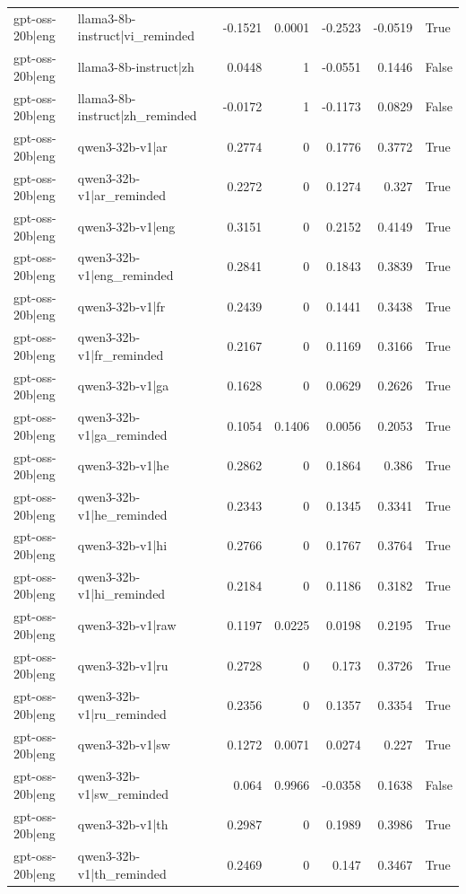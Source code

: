 \begin{table}
\begin{tabular}{l l r r r r l}
gpt-oss-20b|eng & llama3-8b-instruct|vi_reminded & -0.1521 & 0.0001 & -0.2523 & -0.0519 & True \\
gpt-oss-20b|eng & llama3-8b-instruct|zh & 0.0448 & 1 & -0.0551 & 0.1446 & False \\
gpt-oss-20b|eng & llama3-8b-instruct|zh_reminded & -0.0172 & 1 & -0.1173 & 0.0829 & False \\
gpt-oss-20b|eng & qwen3-32b-v1|ar & 0.2774 & 0 & 0.1776 & 0.3772 & True \\
gpt-oss-20b|eng & qwen3-32b-v1|ar_reminded & 0.2272 & 0 & 0.1274 & 0.327 & True \\
gpt-oss-20b|eng & qwen3-32b-v1|eng & 0.3151 & 0 & 0.2152 & 0.4149 & True \\
gpt-oss-20b|eng & qwen3-32b-v1|eng_reminded & 0.2841 & 0 & 0.1843 & 0.3839 & True \\
gpt-oss-20b|eng & qwen3-32b-v1|fr & 0.2439 & 0 & 0.1441 & 0.3438 & True \\
gpt-oss-20b|eng & qwen3-32b-v1|fr_reminded & 0.2167 & 0 & 0.1169 & 0.3166 & True \\
gpt-oss-20b|eng & qwen3-32b-v1|ga & 0.1628 & 0 & 0.0629 & 0.2626 & True \\
gpt-oss-20b|eng & qwen3-32b-v1|ga_reminded & 0.1054 & 0.1406 & 0.0056 & 0.2053 & True \\
gpt-oss-20b|eng & qwen3-32b-v1|he & 0.2862 & 0 & 0.1864 & 0.386 & True \\
gpt-oss-20b|eng & qwen3-32b-v1|he_reminded & 0.2343 & 0 & 0.1345 & 0.3341 & True \\
gpt-oss-20b|eng & qwen3-32b-v1|hi & 0.2766 & 0 & 0.1767 & 0.3764 & True \\
gpt-oss-20b|eng & qwen3-32b-v1|hi_reminded & 0.2184 & 0 & 0.1186 & 0.3182 & True \\
gpt-oss-20b|eng & qwen3-32b-v1|raw & 0.1197 & 0.0225 & 0.0198 & 0.2195 & True \\
gpt-oss-20b|eng & qwen3-32b-v1|ru & 0.2728 & 0 & 0.173 & 0.3726 & True \\
gpt-oss-20b|eng & qwen3-32b-v1|ru_reminded & 0.2356 & 0 & 0.1357 & 0.3354 & True \\
gpt-oss-20b|eng & qwen3-32b-v1|sw & 0.1272 & 0.0071 & 0.0274 & 0.227 & True \\
gpt-oss-20b|eng & qwen3-32b-v1|sw_reminded & 0.064 & 0.9966 & -0.0358 & 0.1638 & False \\
gpt-oss-20b|eng & qwen3-32b-v1|th & 0.2987 & 0 & 0.1989 & 0.3986 & True \\
gpt-oss-20b|eng & qwen3-32b-v1|th_reminded & 0.2469 & 0 & 0.147 & 0.3467 & True \\

\end{tabular}
\end{table}
